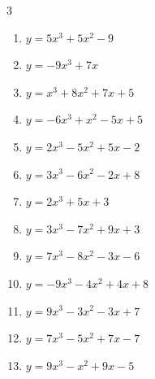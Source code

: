 \begin{multicols}{3}
\begin{enumerate}
  \item $y=5x^{3}+5x^{2}-9$


  \item $y=-9x^{3}+7x$


  \item $y=x^{3}+8x^{2}+7x+5$


\columnbreak %

  \item $y=-6x^{3}+x^{2}-5x+5$


  \item $y=2x^{3}-5x^{2}+5x-2$


  \item $y=3x^{3}-6x^{2}-2x+8$


  \item $y=2x^{3}+5x+3$


  \item $y=3x^{3}-7x^{2}+9x+3$


  \item $y=7x^{3}-8x^{2}-3x-6$


  \item $y=-9x^{3}-4x^{2}+4x+8$


  \item $y=9x^{3}-3x^{2}-3x+7$


  \item $y=7x^{3}-5x^{2}+7x-7$


  \item $y=9x^{3}-x^{2}+9x-5$


\end{enumerate}
\end{multicols}
